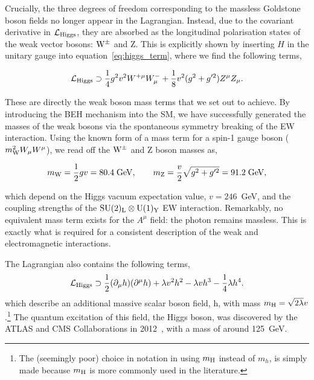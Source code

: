 \noindent
Crucially, the three degrees of freedom corresponding to the massless Goldstone boson fields no longer appear in the Lagrangian. Instead, due to the covariant derivative in $\mathcal{L}_{\rm{Higgs}}$, they are absorbed as the longitudinal polarisation states of the weak vector bosons: ${\rm{W}}^{\pm}$ and Z. This is explicitly shown by inserting $H$ in the unitary gauge into equation~\ref{eq:higgs_term}, where we find the following terms,

\begin{equation}
    \mathcal{L}_{\rm{Higgs}} \supset \frac{1}{4}g^2v^2W^{+\mu}W^-_\mu + \frac{1}{8}v^2(g^2+g'^2)Z^{\mu}Z_\mu.
\end{equation}

\noindent
These are directly the weak boson mass terms that we set out to achieve. By introducing the BEH mechanism into the SM, we have successfully generated the masses of the weak bosons via the spontaneous symmetry breaking of the EW interaction. Using the known form of a mass term for a spin-1 gauge boson ($m_{\rm{W}}^2 W_\mu W^\mu$), we read off the ${\rm{W}}^{\pm}$ and Z boson masses as,

\begin{equation}
    m_{\rm{W}} = \frac{1}{2}gv = 80.4\;{\rm{GeV}}, \qquad m_{\rm{Z}} = \frac{v}{2}\sqrt{g^2+g'^2} = 91.2\;{\rm{GeV}},
\end{equation}

\noindent
which depend on the Higgs vacuum expectation value, $v=246$~GeV, and the coupling strengths of the ${\rm{SU}(2)_{\rm{L}}}\otimes{\rm{U}}(1)_{\rm{Y}}$ EW interaction. Remarkably, no equivalent mass term exists for the $A^\mu$ field: the photon remains massless. This is exactly what is required for a consistent description of the weak and electromagnetic interactions.

The Lagrangian also contains the following terms,
\begin{equation}\label{eq:scalar_lagrangian}
    \mathcal{L}_{\rm{Higgs}} \supset \frac{1}{2}(\partial_\mu h)(\partial^\mu h) + \lambda v^2 h^2 -{\lambda}vh^3 -\frac{1}{4}\lambda h^4.
\end{equation}
\noindent
which describe an additional massive scalar boson field, h, with mass $m_{\rm{H}}=\sqrt{2\lambda}v$.\footnote{The (seemingly poor) choice in notation in using $m_{\rm{H}}$ instead of $m_h$, is simply made because $m_{\rm{H}}$ is more commonly used in the literature.} The quantum excitation of this field, the Higgs boson, was discovered by the ATLAS and CMS Collaborations in 2012~\cite{Aad:2012tfa,Chatrchyan:2012xdj,Chatrchyan:2013lba}, with a mass of around 125~GeV. 

